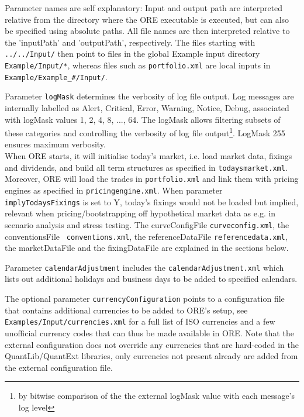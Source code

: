 \documentclass[12pt, a4paper]{article}
\begin{document}
{Parameter names are self explanatory: Input and output path are interpreted relative from the directory where the ORE
executable is executed, but can also be specified using absolute paths. All file names are then interpreted relative to the
'inputPath' and 'outputPath', respectively. The files starting with {\tt ../../Input/} then point to files in the global
Example input directory {\tt Example/Input/*}, whereas files such as {\tt portfolio.xml} are local inputs in {\tt 
Example/Example\_\#/Input/}. 

Parameter {\tt logMask} determines the verbosity of log file output. Log messages are 
internally labelled as Alert, Critical, Error, Warning, Notice, Debug, associated with logMask values 1, 2, 4, 8, ..., 64. 
The logMask allows filtering subsets of these categories and controlling the verbosity of log file output\footnote{by bitwise comparison of the the external logMask value with each message's log level}. LogMask 255 ensures maximum verbosity. \\

When ORE starts, it will initialise today's market, i.e. load market data, fixings and dividends, and build all term
structures as specified in {\tt todaysmarket.xml}.  Moreover, ORE will load the trades in {\tt portfolio.xml} and link
them with pricing engines as specified in {\tt pricingengine.xml}. When parameter {\tt implyTodaysFixings} is set to Y,
today's fixings would not be loaded but implied, relevant when pricing/bootstrapping off hypothetical market data as
e.g. in scenario analysis and stress testing. The curveConfigFile {\tt curveconfig.xml}, the conventionsFile {\tt
  conventions.xml}, the referenceDataFile {\tt referencedata.xml}, the marketDataFile and the fixingDataFile are
explained in the sections below.

\medskip Parameter {\tt calendarAdjustment} includes the {\tt calendarAdjustment.xml} which lists out additional holidays and
business days to be added to specified calendars.

\medskip The optional parameter {\tt currencyConfiguration} points to a configuration file that contains additional currencies
to be added to ORE's setup, see {\tt Examples/Input/currencies.xml} for a full list of ISO currencies and a few unofficial currency
codes that can thus be made available in ORE. Note that the external configuration does not override any currencies that are
hard-coded in the QuantLib/QuantExt libraries, only currencies not present already are added from the external configuration file.

}
\end{document}
